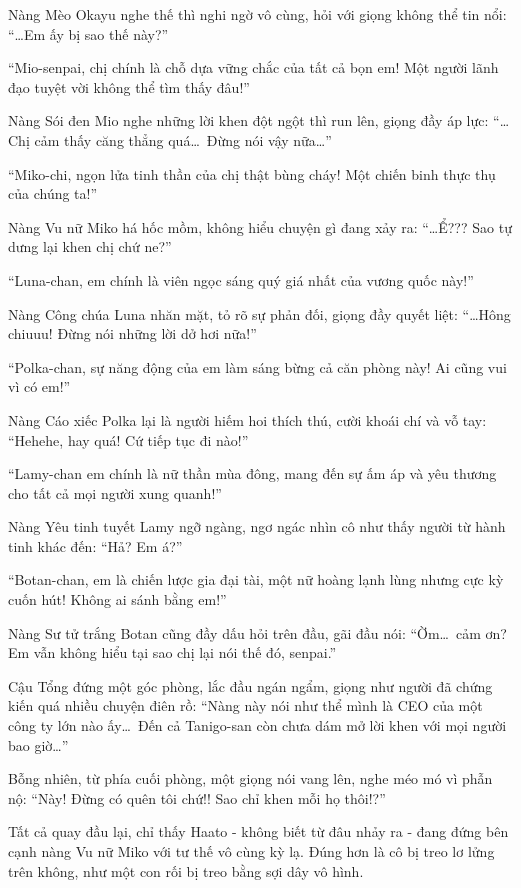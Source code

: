 \documentclass[../main.tex]{subfiles}
\begin{document}
Nàng Mèo Okayu nghe thế thì nghi ngờ vô cùng, hỏi với giọng không thể tin nổi: ``\dots Em ấy bị sao thế này?''

``Mio-senpai, chị chính là chỗ dựa vững chắc của tất cả bọn em! Một người lãnh đạo tuyệt vời không thể tìm thấy đâu!''

Nàng Sói đen Mio nghe những lời khen đột ngột thì run lên, giọng đầy áp lực: ``\dots Chị cảm thấy căng thẳng quá\dots\ Đừng nói vậy nữa\dots''

``Miko-chi, ngọn lửa tinh thần của chị thật bùng cháy! Một chiến binh thực thụ của chúng ta!''

Nàng Vu nữ Miko há hốc mồm, không hiểu chuyện gì đang xảy ra: ``\dots Ể??? Sao tự dưng lại khen chị chứ ne?''

``Luna-chan, em chính là viên ngọc sáng quý giá nhất của vương quốc này!''

Nàng Công chúa Luna nhăn mặt, tỏ rõ sự phản đối, giọng đầy quyết liệt: ``\dots Hông chiuuu! Đừng nói những lời dở hơi nữa!''

``Polka-chan, sự năng động của em làm sáng bừng cả căn phòng này! Ai cũng vui vì có em!''

Nàng Cáo xiếc Polka lại là người hiếm hoi thích thú, cười khoái chí và vỗ tay: ``Hehehe, hay quá! Cứ tiếp tục đi nào!''

``Lamy-chan em chính là nữ thần mùa đông, mang đến sự ấm áp và yêu thương cho tất cả mọi người xung quanh!''

Nàng Yêu tinh tuyết Lamy ngỡ ngàng, ngơ ngác nhìn cô như thấy người từ hành tinh khác đến: ``Hả? Em á?''

``Botan-chan, em là chiến lược gia đại tài, một nữ hoàng lạnh lùng nhưng cực kỳ cuốn hút! Không ai sánh bằng em!''

Nàng Sư tử trắng Botan cũng đầy dấu hỏi trên đầu, gãi đầu nói: ``Ờm\dots\ cảm ơn? Em vẫn không hiểu tại sao chị lại nói thế đó, senpai.''

Cậu Tổng đứng một góc phòng, lắc đầu ngán ngẩm, giọng như người đã chứng kiến quá nhiều chuyện điên rồ: ``Nàng này nói như thể mình là CEO của một công ty lớn nào ấy\dots\ Đến cả Tanigo-san còn chưa dám mở lời khen với mọi người bao giờ\dots''

Bỗng nhiên, từ phía cuối phòng, một giọng nói vang lên, nghe méo mó vì phẫn nộ: ``Này! Đừng có quên tôi chứ!! Sao chỉ khen mỗi họ thôi!?''

Tất cả quay đầu lại, chỉ thấy Haato - không biết từ đâu nhảy ra - đang đứng bên cạnh nàng Vu nữ Miko với tư thế vô cùng kỳ lạ. Đúng hơn là cô bị treo lơ lửng trên không, như một con rối bị treo bằng sợi dây vô hình.
\end{document}
